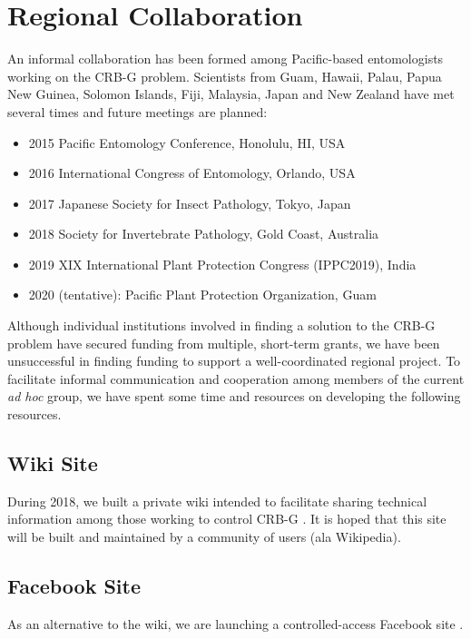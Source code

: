 \documentclass[12pt,letterpaper,english,bibliography=totocnumbered]{scrartcl}
\begin{document}
\section{Regional Collaboration}

An informal collaboration has been formed among Pacific-based entomologists working on the CRB-G problem. Scientists from Guam, Hawaii, Palau, Papua New Guinea, Solomon Islands, Fiji, Malaysia, Japan and New Zealand have met several times and future meetings are planned:
\begin{itemize}
	\item 2015 Pacific Entomology Conference, Honolulu, HI, USA
	\item 2016 International Congress of Entomology, Orlando, USA
	\item 2017 Japanese Society for Insect Pathology, Tokyo, Japan
	\item 2018 Society for Invertebrate Pathology, Gold Coast, Australia
	\item 2019 XIX International Plant Protection Congress (IPPC2019), India
	\item 2020 (tentative): Pacific Plant Protection Organization, Guam	
\end{itemize}

Although individual institutions involved in finding a solution to the CRB-G problem
have secured funding from multiple, short-term grants, we have been unsuccessful in
finding funding to support a well-coordinated regional project. To facilitate informal
communication and cooperation among members of the current \textit{ad hoc} group, we have
spent some time and resources on developing the following resources.

\subsection{Wiki Site}

During 2018, we built a private wiki intended to facilitate sharing technical information among those working to control CRB-G \cite{moore_crb-g_2019}. It is hoped that this site will be built and maintained by a community of users (ala Wikipedia).

\subsection{Facebook Site}

As an alternative to the wiki, we are launching a controlled-access Facebook site \cite{moore_facebook_2019}.
\end{document}
